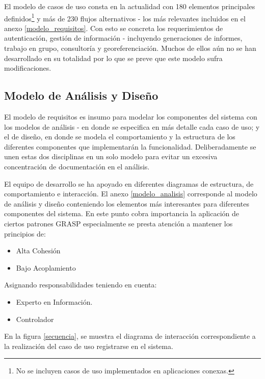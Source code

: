 El modelo de casos de uso consta en la actualidad con 180 elementos principales definidos\footnote{No se incluyen casos de uso implementados en aplicaciones conexas.} y más de 230 flujos alternativos - los más relevantes incluidos en el anexo \ref{modelo_requisitos}. Con esto se concreta los requerimientos de autenticación, gestión de información - incluyendo generaciones de informes, trabajo en grupo, consultoría y georeferenciación. Muchos de ellos aún no se han desarrollado en su totalidad por lo que se preve que este modelo sufra modificaciones.

\subsection{Modelo de Análisis y Diseño}

El modelo de requisitos es insumo para modelar los componentes del sistema con los modelos de análisis - en donde se especifica en más detalle cada caso de uso; y el de diseño, en donde se modela el comportamiento y la estructura de los diferentes componentes que implementarán la funcionalidad. Deliberadamente se unen estas dos disciplinas en un solo modelo para evitar un excesiva concentración de documentación en el análisis.

El equipo de desarrollo se ha apoyado en diferentes diagramas de estructura, de comportamiento e interacción. El anexo \ref{modelo_analisis} corresponde al modelo de análisis y diseño conteniendo los elementos más interesantes para diferentes componentes del sistema. En este punto cobra importancia la aplicación de ciertos patrones GRASP \cite{larman2003} especialmente se presta atención a mantener los principios de:

\begin{itemize}
\item Alta Cohesión
\item Bajo Acoplamiento
\end{itemize}

Asignando responsabilidades teniendo en cuenta:
\begin{itemize}
\item Experto en Información.
\item Controlador
\end{itemize}

En la figura \ref{secuencia}, se muestra el diagrama de interacción correspondiente a la realización del caso de uso registrarse en el sistema.

